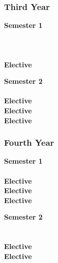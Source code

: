\subsubsection{Third Year}
\begin{center}
\begin{multicols}{2}
\textbf{Semester 1} \\
 \\
 \\
 \\
\textbf{Elective} \\
\vfill
\columnbreak

\textbf{Semester 2} \\
 \\
\textbf{Elective} \\
\textbf{Elective} \\
\textbf{Elective} \\
\end{multicols}
\end{center}

\subsubsection{Fourth Year}
\begin{center}
\begin{multicols}{2}
\textbf{Semester 1} \\
 \\
\textbf{Elective} \\
\textbf{Elective} \\
\textbf{Elective} \\
\vfill
\columnbreak

\textbf{Semester 2} \\
 \\
 \\
\textbf{Elective} \\
\textbf{Elective} \\
\end{multicols}
\end{center}
